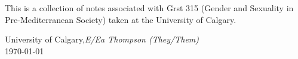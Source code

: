 %
%

\preface

This is a collection of notes associated with Grst 315 (Gender and Sexuality in Pre-Mediterranean Society) taken at the University of Calgary.
 

\vspace{\baselineskip}
\begin{flushright}\noindent
University of Calgary,\hfill {\it E/Ea Thompson (They/Them)}\\
\today \hfill \\
\end{flushright}


